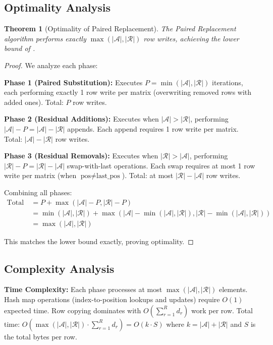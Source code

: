 \documentclass{article}
\numberwithin{equation}{section}
\theoremstyle{plain}
\newtheorem{theorem}{Theorem}[section]
\theoremstyle{definition}
\theoremstyle{remark}
\begin{document}
\subsection{Optimality Analysis}

\begin{theorem}[Optimality of Paired Replacement]
\label{thm:optimality}
The Paired Replacement algorithm performs exactly $\max(|\mathcal{A}|, |\mathcal{R}|)$ row writes, achieving the lower bound of .
\end{theorem}

\begin{proof}
We analyze each phase:

\textbf{Phase 1 (Paired Substitution):} Executes $P = \min(|\mathcal{A}|, |\mathcal{R}|)$ iterations, each performing exactly 1 row write per matrix (overwriting removed rows with added ones). Total: $P$ row writes.

\textbf{Phase 2 (Residual Additions):} Executes when $|\mathcal{A}| > |\mathcal{R}|$, performing $|\mathcal{A}| - P = |\mathcal{A}| - |\mathcal{R}|$ appends. Each append requires 1 row write per matrix. Total: $|\mathcal{A}| - |\mathcal{R}|$ row writes.

\textbf{Phase 3 (Residual Removals):} Executes when $|\mathcal{R}| > |\mathcal{A}|$, performing $|\mathcal{R}| - P = |\mathcal{R}| - |\mathcal{A}|$ swap-with-last operations. Each swap requires at most 1 row write per matrix (when $\text{pos} \neq \text{last\_pos}$). Total: at most $|\mathcal{R}| - |\mathcal{A}|$ row writes.

Combining all phases:
\begin{align}
\text{Total row writes} &= P + \max(|\mathcal{A}| - P, |\mathcal{R}| - P) \\
&= \min(|\mathcal{A}|, |\mathcal{R}|) + \max(|\mathcal{A}| - \min(|\mathcal{A}|, |\mathcal{R}|), |\mathcal{R}| - \min(|\mathcal{A}|, |\mathcal{R}|)) \\
&= \max(|\mathcal{A}|, |\mathcal{R}|)
\end{align}

This matches the lower bound exactly, proving optimality.
\end{proof}

\subsection{Complexity Analysis}

\textbf{Time Complexity:} Each phase processes at most $\max(|\mathcal{A}|, |\mathcal{R}|)$ elements. Hash map operations (index-to-position lookups and updates) require $O(1)$ expected time. Row copying dominates with $O(\sum_{r=1}^R d_r)$ work per row. Total time: $O(\max(|\mathcal{A}|, |\mathcal{R}|) \cdot \sum_{r=1}^R d_r) = O(k \cdot S)$ where $k = |\mathcal{A}| + |\mathcal{R}|$ and $S$ is the total bytes per row.
\end{document}

